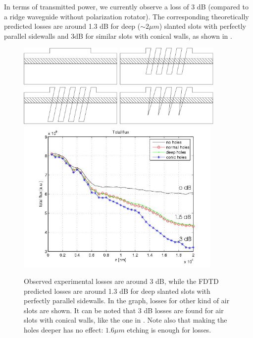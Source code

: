 In terms of transmitted power, we currently observe a loss of 3 dB
(compared to a ridge waveguide without polarization rotator). The
corresponding theoretically predicted losses are around 1.3 dB for
deep ($\sim 2 \mu m$) slanted slots with perfectly parallel sidewalls
and 3dB for similar slots with conical walls, as shown in
.

\begin{figure}[htbp]
  \begin{center}
    \includegraphics[width=5cm]{pics/polrot_no_holes}
    \includegraphics[width=5cm]{pics/polrot_normal_holes}
    \includegraphics[width=5cm]{pics/polrot_deep_holes}
    \includegraphics[width=5cm]{pics/polrot_conical_holes}
    \includegraphics[width=10cm]{pics/polrot_different_holes}
  \end{center}
  \caption{Observed experimental losses are around 3 dB, while the
  FDTD predicted losses are around 1.3 dB for deep slanted slots with
  perfectly parallel sidewalls. In the graph, losses for other kind of
  air slots are shown. It can be noted that 3 dB losses are found for
  air slots with conical walls, like the one in
  . Note also that making the
  holes deeper has no effect: $1.6 \mu m$ etching is enough for
  losses.}
  \label{fig:polrot_holes}
\end{figure}

